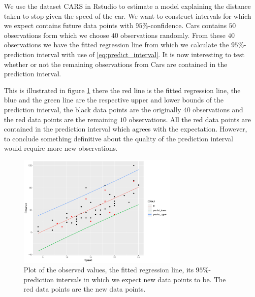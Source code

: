 \begin{example} 
We use the dataset CARS in Rstudio to estimate a model explaining the distance taken to stop given the speed of the car. 
We want to construct intervals for which we expect contains future data points with $95\%$-confidence. 
Cars contains $50$ observations form which we choose $40$ observations randomly. 
From these $40$ observations we have the fitted regression line from which we calculate the $95\%$-prediction interval with use of \eqref{eq:predict_interval}. 
It is now interesting to test whether or not the remaining observations from Cars are contained in the prediction interval. 

This is illustrated in figure \ref{fig:prediction} there the red line is the fitted regression line, the blue and the green line are the respective upper and lower bounds of the prediction interval, the black data points are the originally $40$ observations and the red data points are the remaining $10$ observations. 
All the red data points are contained in the prediction interval 
which agrees with the expectation. 
However, to conclude something definitive about the quality of the prediction interval would require more new observations.
\begin{figure}[H]
    \centering
    \includegraphics[width = 0.7\textwidth]{figures/Nanna/Prediction_plot.pdf}
    \caption{Plot of the observed values, the fitted regression line, its $95\%$-prediction intervals in which we expect new data points to be. The red data points are the new data points.}
    \label{fig:prediction}
\end{figure}



\end{example}



